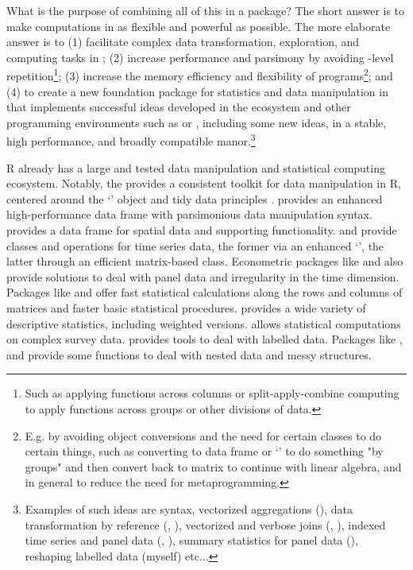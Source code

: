 \documentclass[article]{jss}
\newcommand{\class}[1]{`\code{#1}'}
\begin{document}
What is the purpose of combining all of this in a package? The short answer is to make computations in  as flexible and powerful as possible. The more elaborate answer is to (1) facilitate complex data transformation, exploration, and computing tasks in ; (2) increase performance and parsimony by avoiding -level repetition\footnote{Such as applying  functions across columns or split-apply-combine computing to apply functions across groups or other divisions of data.}; (3) increase the memory efficiency and flexibility of  programs\footnote{E.g. by avoiding object conversions and the need for certain classes to do certain things, such as converting to data frame or \class{data.table} to do something "by groups" and then convert back to matrix to continue with linear algebra, and in general to reduce the need for metaprogramming.}; and (4) to create a new foundation package for statistics and data manipulation in  that implements successful ideas developed in the  ecosystem and other programming environments such as  or  \citep{STATA}, including some new ideas, in a stable, high performance, and broadly compatible manor.\footnote{Examples of such ideas are  syntax, vectorized aggregations (), data transformation by reference (, ), vectorized and verbose joins (, ), indexed time series and panel data (, ), summary statistics for panel data (), reshaping labelled data (myself) etc...} \newline

R already has a large and tested data manipulation and statistical computing ecosystem. Notably, the  \citep{rtidyverse} provides a consistent toolkit for data manipulation in R, centered around the \class{tibble} \citep{rtibble} object and tidy data principles \citep{rtidydata}.  \citep{rdatatable} provides an enhanced high-performance data frame with parsimonious data manipulation syntax.  \citep{rsf} provides a data frame for spatial data and supporting functionality.  \citep{rtsibble} and  \citep{rxts} provide classes and operations for time series data, the former via an enhanced \class{tibble}, the latter through an efficient matrix-based class. Econometric packages like  \citep{rplm} and  \citep{rfixest} also provide solutions to deal with panel data and irregularity in the time dimension. Packages like  \citep{rmatrixstats} and  \citep{rfast} offer fast statistical calculations along the rows and columns of matrices and faster basic statistical procedures.  \citep{rdesctools} provides a wide variety of descriptive statistics, including weighted versions.  \citep{rsurvey} allows statistical computations on complex survey data.  \citep{rlabelled} provides tools to deal with labelled data. Packages like  \citep{rtidyr},  \citep{rpurrr} and  \citep{rrapply} provide some functions to deal with nested data and messy structures. \newline
\end{document}
